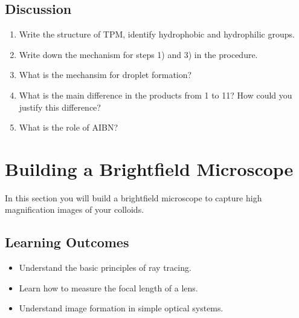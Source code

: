 \documentclass[12pt,a4paper,twoside]{article}
\begin{document}
\subsection{Discussion}

\begin{enumerate}
    \item Write the structure of TPM, identify hydrophobic and hydrophilic groups.
    \vspace{4cm}
    \item Write down the mechanism for steps 1) and 3) in the procedure.
        \vspace{8cm}
    \item What is the mechansim for droplet formation?
    \vspace{2cm}
    \item What is the main difference in the products from 1 to 11? How could you justify this difference?
        \vspace{2cm}
    \item What is the role of AIBN?
        \vspace{2cm}
\end{enumerate}

\newpage

\section{Building a Brightfield Microscope}

In this section you will build a brightfield microscope to capture high magnification images of your colloids.

\subsection{Learning Outcomes}

\begin{itemize}
    \item Understand the basic principles of ray tracing.
    \item Learn how to measure the focal length of a lens.
    \item Understand image formation in simple optical systems.
\end{itemize}
\end{document}
